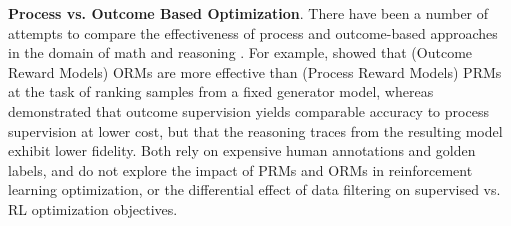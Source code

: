 \documentclass{article} %
\begin{document}
\noindent\textbf{Process vs. Outcome Based Optimization}. There have been a number of attempts to compare the effectiveness of process and outcome-based approaches in the domain of math and reasoning \citep{lightman2023letsverifystepstep, uesato2022solvingmathwordproblems, snell2024scalingllmtesttimecompute}. For example, \citep{lightman2023letsverifystepstep} showed that (Outcome Reward Models) ORMs are more effective than (Process Reward Models) PRMs at the task of ranking samples from a fixed generator model, whereas \citet{uesato2022solvingmathwordproblems} demonstrated that outcome supervision yields comparable accuracy to process supervision at lower cost, but that the reasoning traces from the resulting model exhibit lower fidelity. Both rely on expensive human annotations and golden labels, and do not explore the impact of PRMs and ORMs in reinforcement learning optimization, or the differential effect of data filtering on supervised vs. RL optimization objectives.
\end{document}
